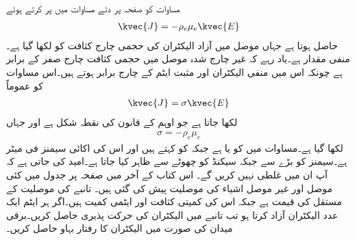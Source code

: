 مساوات  کو صفحہ  پر دئے مساوات  میں پر کرتے ہوئے
\begin{align}
\kvec{J}=-\rho_e \mu_e \kvec{E}
\end{align}
حاصل ہوتا ہے جہاں موصل میں آزاد الیکٹران کی حجمی چارج کثافت کو  لکھا گیا ہے۔ منفی مقدار ہے۔یاد رہے کہ غیر چارج شدہ موصل میں حجمی کثافت چارج صفر کے برابر ہے چونکہ اس میں منفی الیکٹران  اور مثبت ایٹم کے چارج برابر ہوتے ہیں۔اس مساوات کو عموماً
\begin{align}\label{مساوات_کپیسٹر-اوہم_قانون_نقطہ_شکل}
\kvec{J}=\sigma \kvec{E}
\end{align}
لکھا جاتا ہے جو اوہم کے قانون کی نقطہ شکل ہے اور جہاں
\begin{align}\label{مساوات_کپیسٹر_موصلیت_تعریف}
\sigma=-\rho_e \mu_e
\end{align}
لکھا گیا ہے۔مساوات  میں  کو  یا  ہے جبکہ  کو  کہتے ہیں اور اس کی اکائی سیمنز فی میٹر  ہے۔سیمنز کو بڑے  سے  جبکہ سیکنڈ کو چھوٹے  سے ظاہر کیا جاتا ہے۔امید کی جاتی ہے کہ آپ ان میں غلطی نہیں کریں گے۔ اس کتاب کے آخر میں صفحہ   پر جدول  میں کئی موصل اور غیر موصل اشیاء کی موصلیت پیش کی گئی ہیں۔
تانبے کی موصلیت کے مستقل  کی قیمت  ہے جبکہ اس کی کمیتی کثافت  اور ایٹمی کمیت  ہیں۔اگر ہر ایٹم ایک عدد الیکٹران آزاد کرتا ہو تب تانبے میں الیکٹران کی حرکت پذیری حاصل کریں۔برقی میدان  کی صورت میں الیکٹران کا رفتار بہاو حاصل کریں۔

